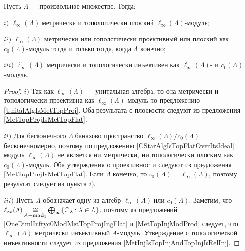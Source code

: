\begin{proposition}\label{c0AndlInftyModlIfty} Пусть $\Lambda$ --- произвольное множество. Тогда:

$i)$ $\ell_\infty(\Lambda)$ метрически и топологически плоский $\ell_\infty(\Lambda)$-модуль;

$ii)$ $\ell_\infty(\Lambda)$ метрически или топологически проективный или плоский как $c_0(\Lambda)$-модуль тогда и только тогда, когда $\Lambda$ конечно;

$iii)$ $\ell_\infty(\Lambda)$ метрически и топологически инъективен как $\ell_\infty(\Lambda)$- и $c_0(\Lambda)$-модуль.
\end{proposition}
\begin{proof} $i)$ Так как $\ell_\infty(\Lambda)$ --- унитальная алгебра, то она метрически и топологически проективна как $\ell_\infty(\Lambda)$-модуль по предложению \ref{UnitalAlgIsMetTopProj}. Оба результата о плоскости следуют из предложения \ref{MetTopProjIsMetTopFlat}.

$ii)$ Для бесконечного $\Lambda$ банахово пространство $\ell_\infty(\Lambda)/c_0(\Lambda)$ бесконечномерно, поэтому по предложению \ref{CStarAlgIsTopFlatOverItsIdeal} модуль $\ell_\infty(\Lambda)$ не является ни метрически, ни топологически плоским как $c_0(\Lambda)$-модуль. Оба утверждения о проективности следуют из предложения \ref{MetTopProjIsMetTopFlat}. Если $\Lambda$ конечно, то $c_0(\Lambda)=\ell_\infty(\Lambda)$, поэтому результат следует из пункта $i)$.

$iii)$ Пусть $A$ обозначает одну из алгебр $\ell_\infty(\Lambda)$ или $c_0(\Lambda)$. Заметим, что $\ell_\infty(\Lambda)\mathop{\mathbin{\cong}}\limits_{A-\mathbf{mod}_1}\bigoplus_\infty\{\mathbb{C}_\lambda:\lambda\in\Lambda\}$, поэтому из предложений \ref{OneDimlInftyc0ModMetTopProjIngFlat} и \ref{MetTopInjModProd} следует, что $\ell_\infty(\Lambda)$ метрически инъективный $A$-модуль. Утверждение о топологической инъективности следует из предложения \ref{MetInjIsTopInjAndTopInjIsRelInj}.
\end{proof}

